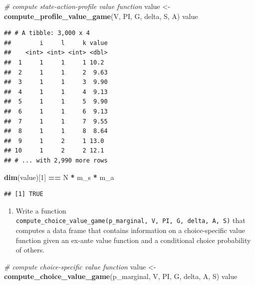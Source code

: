\documentclass[]{book}
\newenvironment{Shaded}{\begin{snugshade}}{\end{snugshade}}
\newcommand{\KeywordTok}[1]{\textcolor[rgb]{0.13,0.29,0.53}{\textbf{#1}}}
\newcommand{\DecValTok}[1]{\textcolor[rgb]{0.00,0.00,0.81}{#1}}
\newcommand{\StringTok}[1]{\textcolor[rgb]{0.31,0.60,0.02}{#1}}
\newcommand{\CommentTok}[1]{\textcolor[rgb]{0.56,0.35,0.01}{\textit{#1}}}
\newcommand{\OperatorTok}[1]{\textcolor[rgb]{0.81,0.36,0.00}{\textbf{#1}}}
\newcommand{\NormalTok}[1]{#1}
\providecommand{\tightlist}{%
  \setlength{\itemsep}{0pt}\setlength{\parskip}{0pt}}
\begin{document}
\begin{Shaded}
\begin{Highlighting}[]
\CommentTok{# compute state-action-profile value function}
\NormalTok{value <-}\StringTok{ }\KeywordTok{compute_profile_value_game}\NormalTok{(V, PI, G, delta, S, A)}
\NormalTok{value}
\end{Highlighting}
\end{Shaded}

\begin{verbatim}
## # A tibble: 3,000 x 4
##        i     l     k value
##    <int> <int> <int> <dbl>
##  1     1     1     1 10.2 
##  2     1     1     2  9.63
##  3     1     1     3  9.90
##  4     1     1     4  9.13
##  5     1     1     5  9.90
##  6     1     1     6  9.13
##  7     1     1     7  9.55
##  8     1     1     8  8.64
##  9     1     2     1 13.0 
## 10     1     2     2 12.1 
## # ... with 2,990 more rows
\end{verbatim}

\begin{Shaded}
\begin{Highlighting}[]
\KeywordTok{dim}\NormalTok{(value)[}\DecValTok{1}\NormalTok{] }\OperatorTok{==}\StringTok{ }\NormalTok{N }\OperatorTok{*}\StringTok{ }\NormalTok{m_s }\OperatorTok{*}\StringTok{ }\NormalTok{m_a}
\end{Highlighting}
\end{Shaded}

\begin{verbatim}
## [1] TRUE
\end{verbatim}

\begin{enumerate}
\def\labelenumi{\arabic{enumi}.}
\setcounter{enumi}{8}
\tightlist
\item
  Write a function
  \texttt{compute\_choice\_value\_game(p\_marginal,\ V,\ PI,\ G,\ delta,\ A,\ S)}
  that computes a data frame that contains information on a
  choice-specific value function given an ex-ante value function and a
  conditional choice probability of others.
\end{enumerate}

\begin{Shaded}
\begin{Highlighting}[]
\CommentTok{# compute choice-specific value function}
\NormalTok{value <-}\StringTok{ }\KeywordTok{compute_choice_value_game}\NormalTok{(p_marginal, V, PI, G, delta, A, S)}
\NormalTok{value}
\end{Highlighting}
\end{Shaded}
\end{document}
